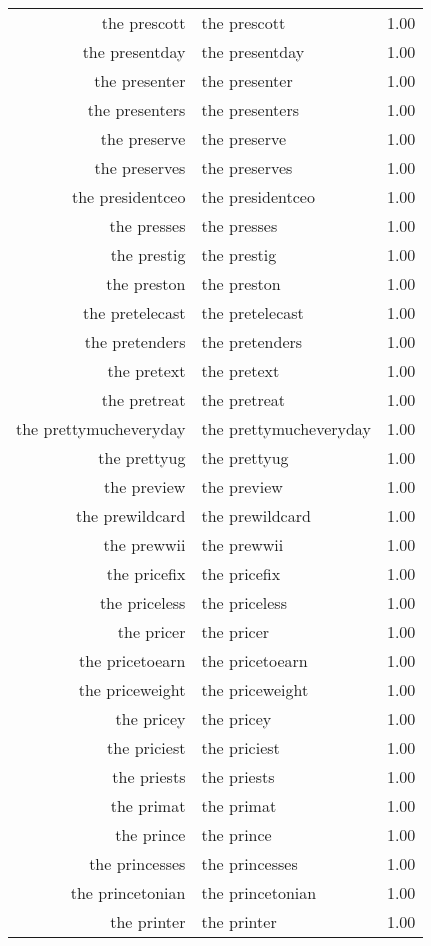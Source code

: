 \begin{table}[ht]
\begin{tabular}{rlr}
  the prescott & the prescott & 1.00 \\ 
  the presentday & the presentday & 1.00 \\ 
  the presenter & the presenter & 1.00 \\ 
  the presenters & the presenters & 1.00 \\ 
  the preserve & the preserve & 1.00 \\ 
  the preserves & the preserves & 1.00 \\ 
  the presidentceo & the presidentceo & 1.00 \\ 
  the presses & the presses & 1.00 \\ 
  the prestig & the prestig & 1.00 \\ 
  the preston & the preston & 1.00 \\ 
  the pretelecast & the pretelecast & 1.00 \\ 
  the pretenders & the pretenders & 1.00 \\ 
  the pretext & the pretext & 1.00 \\ 
  the pretreat & the pretreat & 1.00 \\ 
  the prettymucheveryday & the prettymucheveryday & 1.00 \\ 
  the prettyug & the prettyug & 1.00 \\ 
  the preview & the preview & 1.00 \\ 
  the prewildcard & the prewildcard & 1.00 \\ 
  the prewwii & the prewwii & 1.00 \\ 
  the pricefix & the pricefix & 1.00 \\ 
  the priceless & the priceless & 1.00 \\ 
  the pricer & the pricer & 1.00 \\ 
  the pricetoearn & the pricetoearn & 1.00 \\ 
  the priceweight & the priceweight & 1.00 \\ 
  the pricey & the pricey & 1.00 \\ 
  the priciest & the priciest & 1.00 \\ 
  the priests & the priests & 1.00 \\ 
  the primat & the primat & 1.00 \\ 
  the prince & the prince & 1.00 \\ 
  the princesses & the princesses & 1.00 \\ 
  the princetonian & the princetonian & 1.00 \\ 
  the printer & the printer & 1.00 \\ 

\end{tabular}
\end{table}
